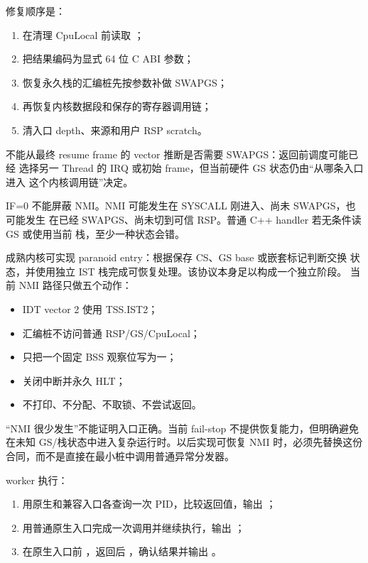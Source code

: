 修复顺序是：

\begin{enumerate}[label=\arabic*.]
  \item 在清理 CpuLocal 前读取 ；
  \item 把结果编码为显式 64 位 C ABI 参数；
  \item 恢复永久栈的汇编桩先按参数补做 SWAPGS；
  \item 再恢复内核数据段和保存的寄存器调用链；
  \item {} 清入口 depth、来源和用户 RSP scratch。
\end{enumerate}

不能从最终 resume frame 的 vector 推断是否需要 SWAPGS：返回前调度可能已经
选择另一 Thread 的 IRQ 或初始 frame，但当前硬件 GS 状态仍由“从哪条入口进入
这个内核调用链”决定。

IF=0 不能屏蔽 NMI。NMI 可能发生在 SYSCALL 刚进入、尚未 SWAPGS，也可能发生
在已经 SWAPGS、尚未切到可信 RSP。普通 C++ handler 若无条件读 GS 或使用当前
栈，至少一种状态会错。

成熟内核可实现 paranoid entry：根据保存 CS、GS base 或嵌套标记判断交换
状态，并使用独立 IST 栈完成可恢复处理。该协议本身足以构成一个独立阶段。
当前 NMI 路径只做五个动作：

\begin{itemize}
  \item IDT vector 2 使用 TSS.IST2；
  \item 汇编桩不访问普通 RSP/GS/CpuLocal；
  \item 只把一个固定 BSS 观察位写为一；
  \item 关闭中断并永久 HLT；
  \item 不打印、不分配、不取锁、不尝试返回。
\end{itemize}

\begin{failurebox}
“NMI 很少发生”不能证明入口正确。当前 fail-stop 不提供恢复能力，但明确避免
在未知 GS/栈状态中进入复杂运行时。以后实现可恢复 NMI 时，必须先替换这份
合同，而不是直接在最小桩中调用普通异常分发器。
\end{failurebox}

worker 执行：

\begin{enumerate}[label=\arabic*.]
  \item 用原生和兼容入口各查询一次 PID，比较返回值，输出
    ；
  \item 用普通原生入口完成一次调用并继续执行，输出
    ；
  \item 在原生入口前 ，返回后 ，确认结果并输出
    。
\end{enumerate}


